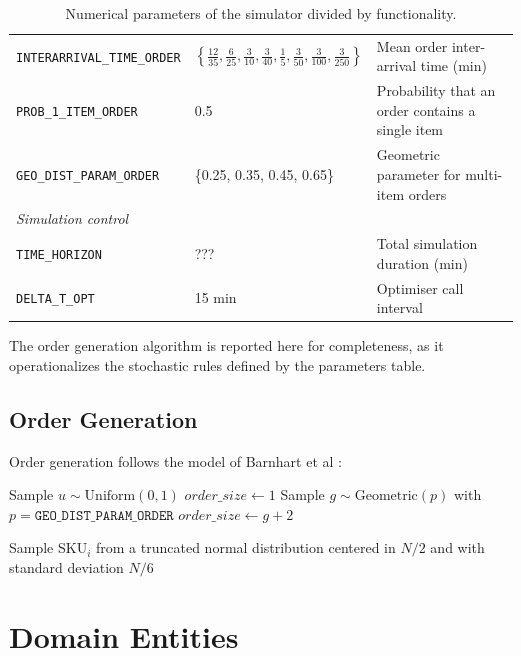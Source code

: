 \documentclass[a4paper,10pt]{article}
\begin{document}
\begin{table}[htbp]
\begin{longtable}{p{5cm} p{4.5cm} p{5.5cm}}
\texttt{INTERARRIVAL\_TIME\_ORDER} & $\left\{\frac{12}{35}, \frac{6}{25}, \frac{3}{10}, \frac{3}{40}, \frac{1}{5}, \frac{3}{50}, \frac{3}{100}, \frac{3}{250}\right\}$ & Mean order inter-arrival time (min) \\
\texttt{PROB\_1\_ITEM\_ORDER}   & 0.5                     & Probability that an order contains a single item \\
\texttt{GEO\_DIST\_PARAM\_ORDER}& \{0.25, 0.35, 0.45, 0.65\} & Geometric parameter for multi-item orders \\[6pt]
\multicolumn{3}{l}{\textit{Simulation control}} \\[2pt]
\texttt{TIME\_HORIZON}          & ???         & Total simulation duration (min) \\
\texttt{DELTA\_T\_OPT}          & 15 min      & Optimiser call interval \\
\bottomrule
\end{longtable}
\caption{Numerical parameters of the simulator divided by functionality.}
\end{table}

The order generation algorithm is reported here for completeness, as it operationalizes the stochastic rules defined by the parameters table.

\subsection{Order Generation}
Order generation follows the model of Barnhart et al \cite{Barnhart2024}:
\begin{algorithm}
\caption{Order Generation}
\begin{algorithmic}[1]
\State Sample $u \sim \text{Uniform}(0,1)$
    \State $order\_size \gets 1$
\Else
    \State Sample $g \sim \text{Geometric}(p)$ with $p = \texttt{GEO\_DIST\_PARAM\_ORDER}$
    \State $order\_size \gets g + 2$
\EndIf

    \State Sample SKU$_i$ from a truncated normal distribution centered in $N/2$ and with standard deviation $N/6$ 
\EndFor
\end{algorithmic}
\end{algorithm}

\newpage \clearpage
\section{Domain Entities}
\end{document}
